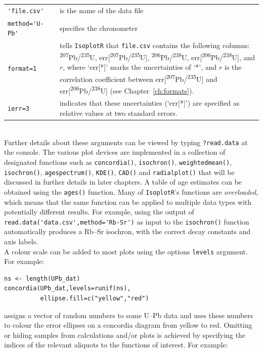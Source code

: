 \begin{refsection}
\noindent\begin{tabular}{@{}p{}@{}p{}@{}p{}@{}}
\verb|'file.csv'| && is the name of the data file\\
\verb|method='U-Pb'| && specifies the chronometer\\
\verb|format=1| && tells \texttt{IsoplotR} that \verb|file.csv|
contains the following columns: \textsuperscript{207}Pb/\textsuperscript{235}U,
err[\textsuperscript{207}Pb/\textsuperscript{235}U],
\textsuperscript{206}Pb/\textsuperscript{238}U,
err[\textsuperscript{206}Pb/\textsuperscript{238}U], and
$r$, where `err[*]' marks the uncertainties of `*', and $r$ is
the correlation coefficient between
err[\textsuperscript{207}Pb/\textsuperscript{235}U]
and err[\textsuperscript{206}Pb/\textsuperscript{238}U]
(see Chapter~\ref{ch:formats}).\\
\verb|ierr=3| && indicates that these uncertainties (`err[*]') are specified
as relative values at two standard errors.
\end{tabular}\\

\noindent Further details about these arguments can be viewed by
typing \texttt{?read.data} at the console. The various plot devices
are implemented in a collection of designated functions such as
\texttt{concordia()}, \texttt{isochron()}, \texttt{weightedmean()},
\texttt{isochron()}, \texttt{agespectrum()}, \texttt{KDE()},
\texttt{CAD()} and \texttt{radialplot()} that will be discussed in
further details in later chapters. A table of age estimates can be
obtained using the \texttt{ages()} function. Many of
\texttt{IsoplotR}'s functions are \emph{overloaded}, which means that
the same function can be applied to multiple data types with
potentially different results. For example, using the output of
\verb|read.data('data.csv',method='Rb-Sr')| as input to the
\texttt{isochron()} function automatically produces a Rb--Sr isochron,
with the correct decay constants and axis labels.\\

A colour scale can be added to most plots using the options
\texttt{levels} argument. For example:

\begin{verbatim}
ns <- length(UPb_dat)
concordia(UPb_dat,levels=runif(ns),
          ellipse.fill=c("yellow","red")
\end{verbatim}

\noindent assigns a vector of random numbers to some U--Pb data and
uses these numbers to colour the error ellipses on a concordia diagram
from yellow to red. Omitting or hiding samples from calculations
and/or plots is achieved by specifying the indices of the relevant
aliquots to the functions of interest. For example:


\end{refsection}
